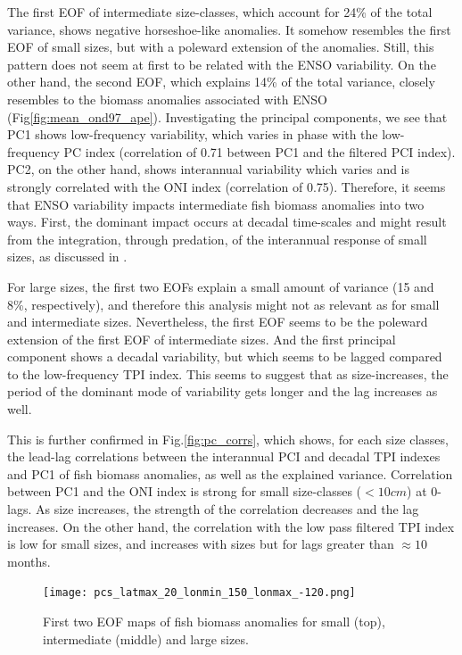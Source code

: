 The first EOF of intermediate size-classes, which account for 24\% of the total variance, shows negative horseshoe-like anomalies. It somehow resembles the first EOF of small sizes, but with a poleward extension of the anomalies. Still, this pattern does not seem at first to be related with the ENSO variability. On the other hand, the second EOF, which explains 14\% of the total variance, closely resembles to the biomass anomalies associated with ENSO (Fig\ref{fig:mean_ond97_ape}). Investigating the principal components, we see that PC1 shows low-frequency variability, which varies in phase with the low-frequency PC index (correlation of 0.71 between PC1 and the filtered PCI index). PC2, on the other hand, shows interannual variability which varies and is strongly correlated with the ONI index (correlation of 0.75). Therefore, it seems that ENSO variability impacts intermediate fish biomass anomalies into two ways. First, the dominant impact occurs at decadal time-scales and might result from the integration, through predation, of the interannual response of small sizes, as discussed in \cite{lorenzoDoubleintegrationHypothesisExplain2013}. 

For large sizes, the first two EOFs explain a small amount of variance (15 and 8\%, respectively), and therefore this analysis might not as relevant as for small and intermediate sizes. Nevertheless, the first EOF seems to be the poleward extension of the first EOF of intermediate sizes. And the first principal component shows a decadal variability, but which seems to be lagged compared to the low-frequency TPI index. This seems to suggest that as size-increases, the period of the dominant mode of variability gets longer and the lag increases as well.

This is further confirmed in Fig.\ref{fig:pc_corrs}, which shows, for each size classes, the lead-lag correlations between the interannual PCI and decadal TPI indexes and PC1 of fish biomass anomalies, as well as the explained variance. Correlation between PC1 and the ONI index is strong for small size-classes ($<10 cm$) at 0-lags. As size increases, the strength of the correlation decreases and the lag increases. On the other hand, the correlation with the low pass filtered TPI index is low for small sizes, and increases with sizes but for lags greater than $\approx 10$ months.

\begin{figure}
    \centering
    \texttt{[image: pcs\_latmax\_20\_lonmin\_150\_lonmax\_-120.png]}
    \caption{First two EOF maps of fish biomass anomalies for small (top), intermediate (middle) and large sizes.}
    \label{fig:eofpcs}
\end{figure}


